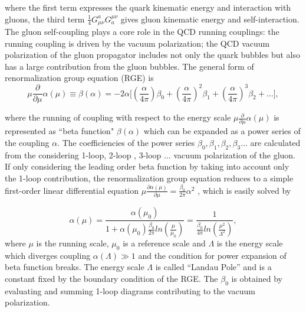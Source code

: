 \noindent where the first term expresses the quark kinematic energy and interaction with gluons, the third term $\frac{1}{4}G^a_{\mu\nu}G^{\mu\nu}_a$  gives gluon kinematic energy and self-interaction. The gluon self-coupling plays a core role in the QCD running couplings: the running coupling is driven by the vacuum polarization; the QCD vacuum polarization of the gluon propagator includes not only the quark bubbles but also has a large contribution from the gluon bubbles. The general form of renormalization group equation (RGE) is
\begin{equation}
	\mu \frac{\partial}{\partial \mu} \alpha(\mu) \equiv \beta(\alpha) = -2\alpha\big [  (\frac{\alpha}{4\pi}) \beta_0 +  (\frac{\alpha}{4\pi}) ^2 \beta_1  +  (\frac{\alpha}{4\pi}) ^3 \beta_2  + \dots \big], 
    \label{eqn:relatedWorks:qft:qcd:rge}
\end{equation}

\noindent where the running of coupling with respect to the energy scale $\mu \frac{\partial}{\partial \mu} \alpha(\mu) $ is represented as ``beta function" $\beta(\alpha)$ which can be expanded as a power series of the coupling $\alpha$. The coefficiencies of the power series $\beta_0, \beta_1 ,\beta_2  ,\beta_3 \dots $ are calculated from the considering 1-loop, 2-loop , 3-loop $\dots$ vacuum polarization of the gluon. If only considering the leading order beta function by taking into account only the 1-loop contribution, the renormalization group equation reduces to a simple first-order linear differential equation $\mu \frac{\partial \alpha(\mu) }{\partial \mu} = \frac{\beta_0}{2\pi} \alpha^2$ , which is easily solved by


\begin{equation}
	\alpha(\mu) = \frac{\alpha(\mu_0) }{1+\alpha(\mu_0) \frac{\beta_0}{2\pi}  ln(\frac{\mu}{\mu_0})}=\frac{1}{\frac{\beta_0}{4\pi}  ln(\frac{\mu^2}{\Lambda^2})},
    \label{eqn:relatedWorks:qft:qcd:zeroOrderRunning}
\end{equation}
\noindent where $\mu$ is the running scale, $\mu_0$ is a reference scale and $\Lambda$  is the energy scale which diverges coupling $\alpha(\Lambda) \gg 1$ and the condition for power expansion of beta function breaks. The energy scale $\Lambda$  is called ``Landau Pole'' and is a constant fixed by the boundary condition of the RGE. The $\beta_0$ is obtained by evaluating and summing 1-loop diagrams contributing to the vacuum polarization. 

